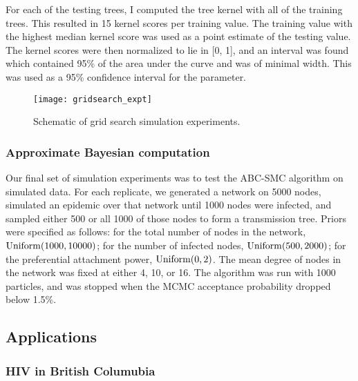 For each of the testing trees, I computed the tree kernel with all of the
training trees. This resulted in 15 kernel scores per training value. The
training value with the highest median kernel score was used as a point
estimate of the testing value. The kernel scores were then normalized to lie in
[0, 1], and an interval was found which contained 95\% of the area under the
curve and was of minimal width. This was used as a 95\% confidence interval for
the parameter.

\begin{figure}[ht]
  \centering
  \texttt{[image: gridsearch\_expt]}
  \caption{Schematic of grid search simulation experiments.}
  \label{fig:gridsearch}
\end{figure}

\subsubsection{Approximate Bayesian computation}

Our final set of simulation experiments was to test the ABC-SMC algorithm on
simulated data. For each replicate, we generated a network on 5000 nodes,
simulated an epidemic over that network until 1000 nodes were infected, and
sampled either 500 or all 1000 of those nodes to form a transmission tree.
Priors were specified as follows: for the total number of nodes in the network,
$\operatorname{Uniform}(1000, 10000)$; for the number of infected nodes, $\operatorname{Uniform}(500,
2000)$; for the preferential attachment power, $\operatorname{Uniform}(0, 2)$. The mean
degree of nodes in the network was fixed at either 4, 10, or 16. The
algorithm was run with 1000 particles, and was stopped when the \gls{MCMC}
acceptance probability dropped below 1.5\%.

\subsection{Applications}

\subsubsection{HIV in British Columubia}
